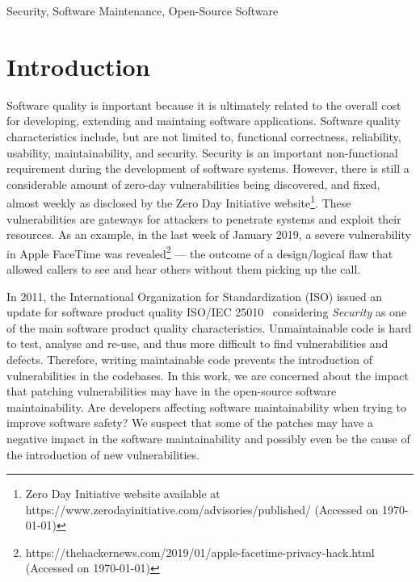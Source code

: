 \documentclass[10pt,conference]{IEEEtran}
\begin{document}
\begin{IEEEkeywords}
Security, Software Maintenance, Open-Source Software
\end{IEEEkeywords}

\section{Introduction}

Software quality is important because it is ultimately related to the overall
cost for developing, extending and maintaing software applications. Software
quality characteristics include, but are not limited to, functional correctness,
reliability, usability, maintainability, and security. Security is an important
non-functional requirement during the development of software systems.  However,
there is still a considerable amount of zero-day vulnerabilities being
discovered, and fixed, almost weekly as disclosed by the Zero Day Initiative
website\footnote{Zero Day Initiative website available  at
https://www.zerodayinitiative.com/advisories/published/ (Accessed on \today{})}. 
These vulnerabilities are gateways for attackers to penetrate 
systems and exploit their resources. 
As an example, in the last week of January 2019, a severe vulnerability in Apple
FaceTime was revealed\footnote{https://thehackernews.com/2019/01/apple-facetime-privacy-hack.html
(Accessed on \today{})} --- the outcome of a design/logical flaw that allowed callers to see and
hear others without them picking up the call. 


In 2011, the International Organization for Standardization (ISO) issued an
update for software product quality ISO/IEC 25010~\cite{iso:2011} considering
\emph{Security} as one of the main software product quality characteristics.
Unmaintainable code is hard to test, analyse and re-use, and thus more difficult
to find vulnerabilities and defects. Therefore, writing maintainable code
prevents the introduction of vulnerabilities in the codebases. In this work, we are
concerned about the impact that patching vulnerabilities may have in the
open-source software maintainability. Are developers affecting software
maintainability when trying to improve software safety? We suspect that some of
the patches may have a negative impact in the software maintainability and
possibly even be the cause of the introduction of new vulnerabilities.
\end{document}
